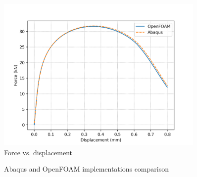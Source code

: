\documentclass[sn-mathphys,Numbered,draft]{sn-jnl}%
\begin{document}
\begin{figure}[htb]
\begin{center}
	\includegraphics[width=0.9\textwidth]{./Figures/LemaitreCompare/axiCompare/1.1LemaitreCompare.png}
\caption{Force vs. displacement}
\label{fig:notchedRoundBAr}
\end{center}
\end{figure}

\begin{figure}[t!]
	\centering
	
		
		\caption{Abaqus and OpenFOAM implementations comparison}
	\label{label_for_entire_figure}
\end{figure}
\FloatBarrier
\end{document}
